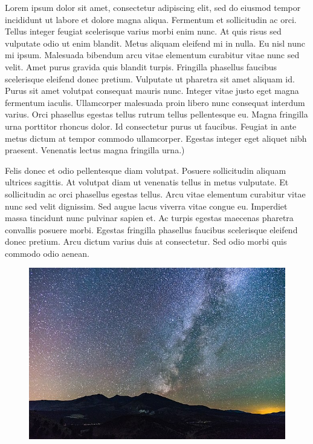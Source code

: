 \documentclass[10pt]{article}
\newenvironment{BoxedInternal}[1][]
{%
  \begin{changemargin}{0cm}{0cm}%
    \begin{mdframed}[roundcorner=5pt,backgroundcolor=swred,outermargin  =-0.5in,innermargin =-0.5in, topline=false, bottomline=false, rightline=false, leftline=false,#1]
    }{%
    \end{mdframed}%
  \end{changemargin}%
}
\newcommand*{\noind}{\setlength{\parindent}{0cm}} %
\newcommand{\bighdr}[2][]{%
\vspace{2pt}
  \begin{BoxedInternal}[#1]{}
    \color{white}\huge\bfseries\headingfont\filcenter{#2}
  \end{BoxedInternal}\vspace{-8pt}%
}
\begin{document}
\begin{multicols}{2} %

{\noind
Lorem ipsum dolor sit amet, consectetur adipiscing elit, sed do eiusmod tempor incididunt ut labore et dolore magna aliqua. Fermentum et sollicitudin ac orci. Tellus integer feugiat scelerisque varius morbi enim nunc. At quis risus sed vulputate odio ut enim blandit. Metus aliquam eleifend mi in nulla. Eu nisl nunc mi ipsum. Malesuada bibendum arcu vitae elementum curabitur vitae nunc sed velit. Amet purus gravida quis blandit turpis. Fringilla phasellus faucibus scelerisque eleifend donec pretium. Vulputate ut pharetra sit amet aliquam id. Purus sit amet volutpat consequat mauris nunc. Integer vitae justo eget magna fermentum iaculis. Ullamcorper malesuada proin libero nunc consequat interdum varius. Orci phasellus egestas tellus rutrum tellus pellentesque eu. Magna fringilla urna porttitor rhoncus dolor. Id consectetur purus ut faucibus. Feugiat in ante metus dictum at tempor commodo ullamcorper. Egestas integer eget aliquet nibh praesent. Venenatis lectus magna fringilla urna.)
}

\bighdr{INTRODUCTION}
{\noind
Felis donec et odio pellentesque diam volutpat. Posuere sollicitudin aliquam ultrices sagittis. At volutpat diam ut venenatis tellus in metus vulputate. Et sollicitudin ac orci phasellus egestas tellus. Arcu vitae elementum curabitur vitae nunc sed velit dignissim. Sed augue lacus viverra vitae congue eu. Imperdiet massa tincidunt nunc pulvinar sapien et. Ac turpis egestas maecenas pharetra convallis posuere morbi. Egestas fringilla phasellus faucibus scelerisque eleifend donec pretium. Arcu dictum varius duis at consectetur. Sed odio morbi quis commodo odio aenean.
}

\begin{figure}[ht]
\centering
\includegraphics[width=\textwidth]{universe.jpg}
\end{figure}


\end{multicols}
\end{document}
